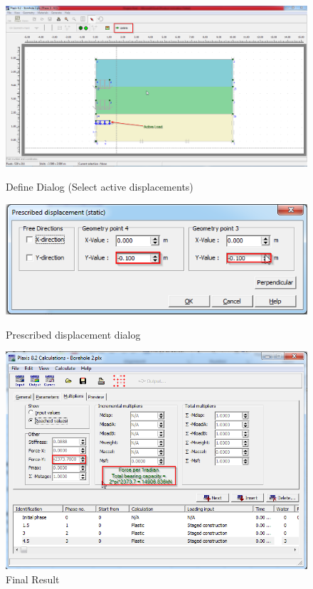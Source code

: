 \begin{landscape}
\begin{figure}[hbtp]
  \vfill
  \centering
  \begin{minipage}[c]{0.35\linewidth}
    \vfill
    \includegraphics[width=\linewidth, height=0.7\textheight,keepaspectratio]{images/plx/a (15).png}
    \caption{Define Dialog (Select active displacements)}
    \vfill
    \includegraphics[width=\linewidth, height=0.3\textheight,keepaspectratio]{images/plx/a (16).png}
    \caption{Prescribed displacement dialog}
    \vfill
  \end{minipage}
  \hfill
  \begin{minipage}[c]{0.6\linewidth}
  \includegraphics[width=\linewidth, height=\textheight,keepaspectratio]{images/plx/a (17).png}
  \caption{Final Result}
  \end{minipage}
\vfill
\end{figure}
\end{landscape}
\break